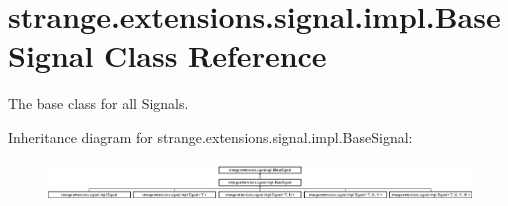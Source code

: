 \hypertarget{classstrange_1_1extensions_1_1signal_1_1impl_1_1_base_signal}{\section{strange.\-extensions.\-signal.\-impl.\-Base\-Signal Class Reference}
\label{classstrange_1_1extensions_1_1signal_1_1impl_1_1_base_signal}
}


The base class for all Signals.  


Inheritance diagram for strange.\-extensions.\-signal.\-impl.\-Base\-Signal\-:\begin{figure}[H]
\begin{center}
\leavevmode
\includegraphics[height=1.073483cm]{classstrange_1_1extensions_1_1signal_1_1impl_1_1_base_signal}
\end{center}
\end{figure}
